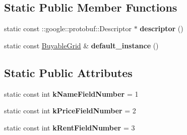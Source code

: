 \subsection*{Static Public Member Functions}
\begin{DoxyCompactItemize}
\item 
\hypertarget{classmonopoly_1_1_buyable_grid_abc93004d09cc3bbea17faaf0f0567180}{}static const \+::google\+::protobuf\+::\+Descriptor $\ast$ {\bfseries descriptor} ()\label{classmonopoly_1_1_buyable_grid_abc93004d09cc3bbea17faaf0f0567180}

\item 
\hypertarget{classmonopoly_1_1_buyable_grid_ac132c68911c7d3de1b0bf3a89824d38a}{}static const \hyperlink{classmonopoly_1_1_buyable_grid}{Buyable\+Grid} \& {\bfseries default\+\_\+instance} ()\label{classmonopoly_1_1_buyable_grid_ac132c68911c7d3de1b0bf3a89824d38a}

\end{DoxyCompactItemize}
\subsection*{Static Public Attributes}
\begin{DoxyCompactItemize}
\item 
\hypertarget{classmonopoly_1_1_buyable_grid_a450839b2b638a7f0081e57d5fa8638ae}{}static const int {\bfseries k\+Name\+Field\+Number} = 1\label{classmonopoly_1_1_buyable_grid_a450839b2b638a7f0081e57d5fa8638ae}

\item 
\hypertarget{classmonopoly_1_1_buyable_grid_a1050fc093851cbcaa83c87eba48a1f1c}{}static const int {\bfseries k\+Price\+Field\+Number} = 2\label{classmonopoly_1_1_buyable_grid_a1050fc093851cbcaa83c87eba48a1f1c}

\item 
\hypertarget{classmonopoly_1_1_buyable_grid_a53b75d5274a0d8a9e7fd5adbeedbe9cc}{}static const int {\bfseries k\+Rent\+Field\+Number} = 3\label{classmonopoly_1_1_buyable_grid_a53b75d5274a0d8a9e7fd5adbeedbe9cc}

\end{DoxyCompactItemize}
